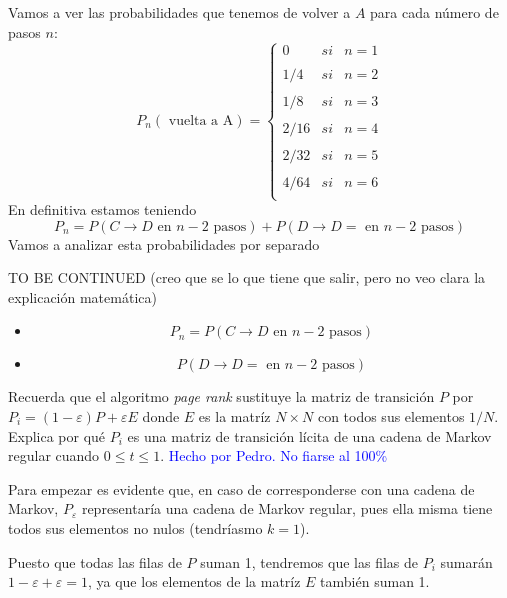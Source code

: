 \begin{problem}[6]
	Vamos a ver las probabilidades que tenemos de volver a $A$ para cada número de pasos $n$:
	\[P_n(\text{ vuelta a A}) = \left\{ \begin{array}{lcc}
             0 &   si  &  n=1\\
             \\ 1/4 &   si  &  n=2 \\
             \\ 1/8 &   si  &  n=3 \\
             \\ 2/16 &   si  &  n=4 \\
             \\ 2/32 &   si  &  n=5 \\
             \\ 4/64 &   si  &  n=6 \\
             \end{array}
   \right.\]
   En definitiva estamos teniendo
   \[P_n = P\left(C \to D \text{ en } n-2 \text{ pasos}\right) + P\left(D \to D= \text{ en } n-2 \text{ pasos}\right)\]
   Vamos a analizar esta probabilidades por separado

   TO BE CONTINUED (creo que se lo que tiene que salir, pero no veo clara la explicación matemática)
   \begin{itemize}
   \item
   \[P_n = P\left(C \to D \text{ en } n-2 \text{ pasos}\right) \]

   \item
   \[ P\left(D \to D= \text{ en } n-2 \text{ pasos}\right)\]
   \end{itemize}
\end{problem}

\begin{problem}[7]
	Recuerda que el algoritmo \textit{page rank} sustituye la matriz de transición $P$ por $P_i = (1-ε)P+εE$ donde $E$ es la matríz $N\times N$ con todos sus elementos $1/N$. Explica por qué $P_i$ es una matriz de transición lícita de una cadena de Markov regular cuando $0 \leq t \leq 1$.
	\solution
	\textcolor{blue}{Hecho por Pedro. No fiarse al 100\%}

	Para empezar es evidente que, en caso de corresponderse con una cadena de Markov, $P_ε$ representaría una cadena de Markov regular, pues ella misma tiene todos sus elementos no nulos (tendríasmo $k=1$).

	Puesto que todas las filas de $P$ suman 1, tendremos que las filas de $P_i$ sumarán $1-ε+ε=1$, ya que los elementos de la matríz $E$ también suman 1.

\end{problem}


